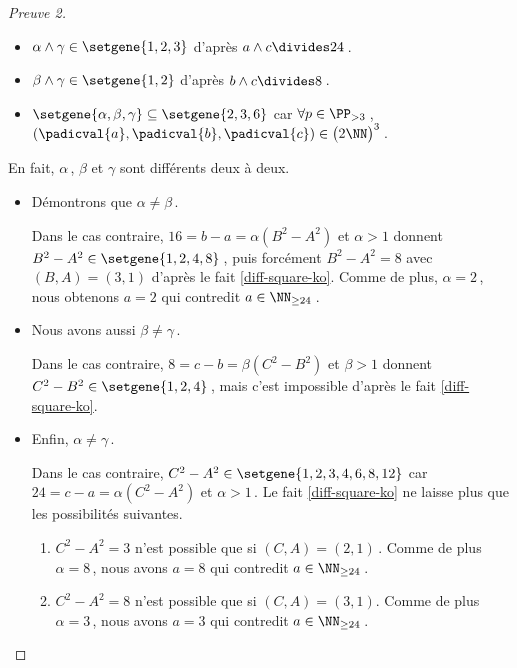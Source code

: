 \begin{proof}[Preuve 2]
\begin{itemize}
		\item $\alpha \wedge \gamma \in \setgene{1, 2, 3}$
		d'après $a \wedge c \divides 24$\,.

		\item $\beta \wedge \gamma \in \setgene{1, 2}$
		d'après $b \wedge c \divides 8$\,.

		\item $\setgene{\alpha, \beta, \gamma} \subseteq \setgene{2, 3, 6}$
		car $\forall p \in \PP_{>3}$\,, $(\padicval{a}, \padicval{b}, \padicval{c}) \in \big( 2 \NN \big)^3$\,. 
    \end{itemize}
		
	\newpage

	En fait, $\alpha$\,, $\beta$ et $\gamma$ sont différents deux à deux.
	
    \begin{itemize}	
		\item Démontrons que $\alpha \neq \beta$\,. 
		
		\noindent
		Dans le cas contraire, $16 = b - a = \alpha(B^2 - A^2)$ et $\alpha > 1$ donnent $B^2 - A^2 \in \setgene{1, 2, 4, 8}$\,, puis forcément $B^2 - A^2 = 8$ avec $(B, A) = (3, 1)$ d'après le fait \ref{diff-square-ko}.
		Comme de plus, $\alpha = 2$\,, nous obtenons $a = 2$ qui contredit $a \in \NN_{\geq 24}$\,.		

		\item Nous avons aussi $\beta \neq \gamma$\,. 
		
		\noindent
		Dans le cas contraire, $8 = c - b = \beta(C^2 - B^2)$ et $\beta > 1$ donnent $C^2 - B^2 \in \setgene{1, 2, 4}$\,, mais c'est impossible d'après le fait \ref{diff-square-ko}.
		

		\item Enfin, $\alpha \neq \gamma$\,. 
		
		\noindent
		Dans le cas contraire,
		$C^2 - A^2 \in \setgene{1, 2, 3, 4, 6, 8, 12}$
		car 
		$24 = c - a = \alpha(C^2 - A^2)$ et $\alpha > 1$\,.
		Le fait \ref{diff-square-ko} ne laisse plus que les possibilités suivantes.
		\begin{enumerate}
			\item $C^2 - A^2 = 3$ n'est possible que si $(C, A) = (2, 1)$\,.
			Comme de plus $\alpha = 8$\,, nous avons $a = 8$ qui contredit $a \in \NN_{\geq 24}$\,.
			
			
			\item $C^2 - A^2 = 8$ n'est possible que si $(C, A) = (3, 1)$.
			Comme de plus $\alpha = 3$\,, nous avons $a = 3$ qui contredit $a \in \NN_{\geq 24}$\,.
			

\end{enumerate}
\end{itemize}
\end{proof}
